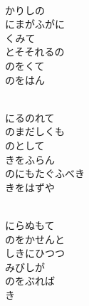 \documentclass[10pt,b5j]{tarticle} %
\begin{document}
\begin{enumerate}
\begin{minipage}[c]{\blocksize}
        \vspace{\linespace}
        \item~\\
        かりしの\\
        にまがふがに\\
        くみて\\
        とそそれるの\\
        のをくて\\
        のをはん
        
    \end{minipage}
    \begin{minipage}[c]{\blocksize}
        
        \vspace{\linespace}
        \item~\\
        にるのれて\\
        のまだしくも\\
        のとして\\
        きをふらん\\
        のにもたぐふべき\\
        きをはずや
        
    \end{minipage}
    \begin{minipage}[c]{\blocksize}
        
        \vspace{\linespace}
        \item~\\
        にらぬもて\\
        のをかせんと\\
        しきにひつつ\\
        みびしが\\
        のをぶれば\\
        き
        

\end{minipage}
\end{enumerate}
\end{document}
